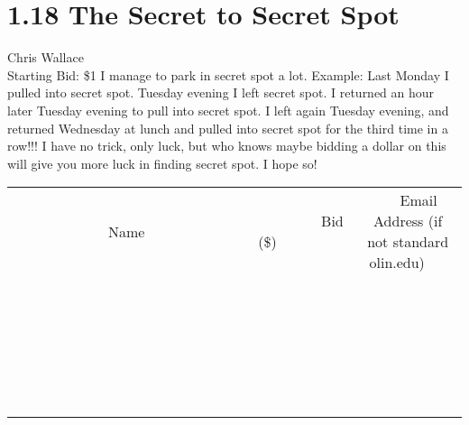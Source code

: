 \documentclass[11pt]{article}
\begin{document}
\section*{1.18 The Secret to Secret Spot}
Chris Wallace
\\
Starting Bid: \$1
\newline
I manage to park in secret spot a lot. Example: Last Monday I pulled into secret spot. Tuesday evening I left secret spot. I returned an hour later Tuesday evening to pull into secret spot. I left again Tuesday evening, and returned Wednesday at lunch and pulled into secret spot for the third time in a row!!! I have no trick, only luck, but who knows maybe bidding a dollar on this will give you more luck in finding secret spot. I hope so!
\\[6ex]
\begin{tabular}{c c c}
~~~~~~~~~~~~~Name~~~~~~~~~~~~~ & ~~~~~~~~~Bid (\$)~~~~~~~~~  & ~~~Email Address (if not standard olin.edu)~~~\\
 & & \\
\hline
 & & \\
\hline
 & & \\
\hline
 & & \\
\hline
 & & \\
\hline
 & & \\
\hline
 & & \\
\hline
 & & \\
\hline
 & & \\
\hline
 & & \\
\hline
 & & \\
\hline
 & & \\
\hline
 & & \\
\hline
 & & \\
\hline
 & & \\
\hline
 & & \\
\hline
 & & \\
\hline
 & & \\
\hline
 & & \\
\hline
 & & \\
\hline
 & & \\
\hline
 & & \\
\hline
 & & \\
\hline
 & & \\
\hline
 & & \\
\hline
 & & \\
\hline
\end{tabular}
\newpage
\end{document}
